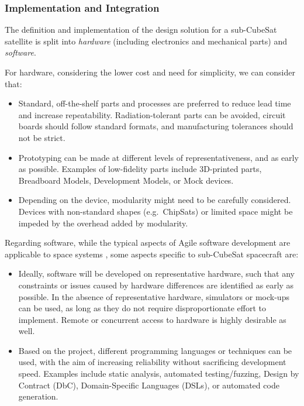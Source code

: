 \documentclass[journal,10pt]{IEEEtran}
\begin{document}
\subsubsection{Implementation and Integration}
\label{sec:methodology_implementation}

The definition and implementation of the design solution for a sub-CubeSat satellite is split into \emph{hardware} (including electronics and mechanical parts) and \emph{software}.

For hardware, considering the lower cost and need for simplicity, we can consider that:
\begin{itemize}
	\item Standard, off-the-shelf parts and processes are preferred to reduce lead time and increase repeatability. Radiation-tolerant parts can be avoided, circuit boards should follow standard formats, and manufacturing tolerances should not be strict.
	\item Prototyping can be made at different levels of representativeness, and as early as possible. Examples of low-fidelity parts include 3D-printed parts, Breadboard Models, Development Models, or Mock devices.
	\item Depending on the device, modularity might need to be carefully considered. Devices with non-standard shapes (e.g.~ChipSats) or limited space might be impeded by the overhead added by modularity.
\end{itemize}

Regarding software, while the typical aspects of Agile software development are applicable to space systems \autocite{boehmBalancingAgilityDiscipline2004}, some aspects specific to sub-CubeSat spacecraft are:
\begin{itemize}
	\item Ideally, software will be developed on representative hardware, such that any constraints or issues caused by hardware differences are identified as early as possible. In the absence of representative hardware, simulators or mock-ups can be used, as long as they do not require disproportionate effort to implement. Remote or concurrent access to hardware is highly desirable as well.
	\item Based on the project, different programming languages or techniques can be used, with the aim of increasing reliability without sacrificing development speed. Examples include static analysis, automated testing/fuzzing, Design by Contract (DbC), Domain-Specific Languages (DSLs), or automated code generation.
\end{itemize}
\end{document}
